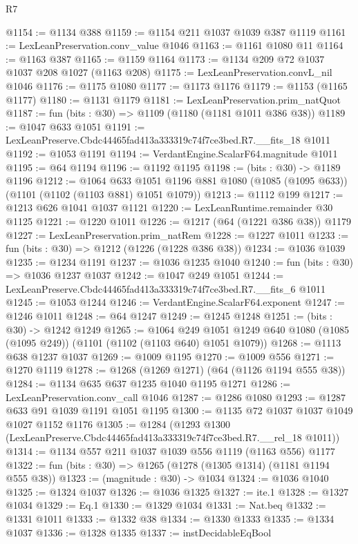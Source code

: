 \begin{lexlean}{R7}
\begin{coremodule}
@1154 := @1134 @388
@1159 := @1154 @211 @1037 @1039 @387 @1119
@1161 := LexLeanPreservation.conv_value @1046
@1163 := @1161 @1080 @11
@1164 := @1163 @387
@1165 := @1159 @1164
@1173 := @1134 @209 @72 @1037 @1037 @208 @1027 (@1163 @208)
@1175 := LexLeanPreservation.convL_nil @1046
@1176 := @1175 @1080
@1177 := @1173 @1176
@1179 := @1153 (@1165 @1177)
@1180 := @1131 @1179
@1181 := LexLeanPreservation.prim_natQuot
@1187 := fun (bits : @30) => @1109 (@1180 (@1181 @1011 @386 @38))
@1189 := @1047 @633 @1051
@1191 := LexLeanPreserve.Cbdc44465fad413a333319c74f7ce3bed.R7.__fits_18 @1011
@1192 := @1053 @1191
@1194 := VerdantEngine.ScalarF64.magnitude @1011
@1195 := @64 @1194
@1196 := @1192 @1195
@1198 := (bits : @30) -> @1189 @1196
@1212 := @1064
    @633
    @1051
    @1196
    @881
    @1080
    (@1085 (@1095 @633))
    (@1101 (@1102 (@1103 @881) @1051 @1079))
@1213 := @1112 @199
@1217 := @1213 @626 @1041 @1037 @1121
@1220 := LexLeanRuntime.remainder @30 @1125
@1221 := @1220 @1011
@1226 := @1217 (@64 (@1221 @386 @38)) @1179
@1227 := LexLeanPreservation.prim_natRem
@1228 := @1227 @1011
@1233 := fun (bits : @30) => @1212 (@1226 (@1228 @386 @38))
@1234 := @1036 @1039
@1235 := @1234 @1191
@1237 := @1036 @1235 @1040
@1240 := fun (bits : @30) => @1036 @1237 @1037
@1242 := @1047 @249 @1051
@1244 := LexLeanPreserve.Cbdc44465fad413a333319c74f7ce3bed.R7.__fits_6 @1011
@1245 := @1053 @1244
@1246 := VerdantEngine.ScalarF64.exponent
@1247 := @1246 @1011
@1248 := @64 @1247
@1249 := @1245 @1248
@1251 := (bits : @30) -> @1242 @1249
@1265 := @1064
    @249
    @1051
    @1249
    @640
    @1080
    (@1085 (@1095 @249))
    (@1101 (@1102 (@1103 @640) @1051 @1079))
@1268 := @1113 @638 @1237 @1037
@1269 := @1009 @1195
@1270 := @1009 @556
@1271 := @1270 @1119
@1278 := @1268 (@1269 @1271) (@64 (@1126 @1194 @555 @38))
@1284 := @1134 @635 @637 @1235 @1040 @1195 @1271
@1286 := LexLeanPreservation.conv_call @1046
@1287 := @1286 @1080
@1293 := @1287 @633 @91 @1039 @1191 @1051 @1195
@1300 := @1135 @72 @1037 @1037 @1049 @1027 @1152 @1176
@1305 := @1284 (@1293 @1300 (LexLeanPreserve.Cbdc44465fad413a333319c74f7ce3bed.R7.__rel_18 @1011))
@1314 := @1134 @557 @211 @1037 @1039 @556 @1119 (@1163 @556) @1177
@1322 := fun (bits : @30) => @1265 (@1278 (@1305 @1314) (@1181 @1194 @555 @38))
@1323 := (magnitude : @30) -> @1034
@1324 := @1036 @1040
@1325 := @1324 @1037
@1326 := @1036 @1325
@1327 := ite.{1}
@1328 := @1327 @1034
@1329 := Eq.{1}
@1330 := @1329 @1034
@1331 := Nat.beq
@1332 := @1331 @1011
@1333 := @1332 @38
@1334 := @1330 @1333
@1335 := @1334 @1037
@1336 := @1328 @1335
@1337 := instDecidableEqBool

\end{coremodule}
\end{lexlean}
